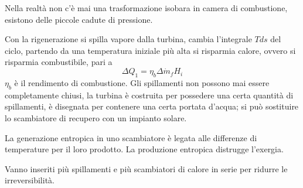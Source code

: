 Nella realtà non c'è mai una trasformazione isobara in camera di combustione,
esistono delle piccole cadute di pressione.

Con la rigenerazione si spilla vapore dalla turbina, cambia l'integrale $Tds$
del ciclo, partendo da una temperatura iniziale più alta si risparmia calore,
ovvero si risparmia combustibile, pari a
$$
\Delta Q_1 = \eta_b\Delta \dot{m}_f H_i
$$
$\eta_b$ è il rendimento di combustione.
Gli spillamenti non possono mai essere completamente chiusi, la turbina è
costruita per possedere una certa quantità di spillamenti, è disegnata per
contenere una certa portata d'acqua; si può sostituire lo scambiatore di
recupero con un impianto solare.

La generazione entropica in uno scambiatore è legata alle differenze di
temperature per il loro prodotto.
La produzione entropica distrugge l'exergia.

Vanno inseriti più spillamenti e più scambiatori di calore in serie per ridurre
le irreversibilità.


